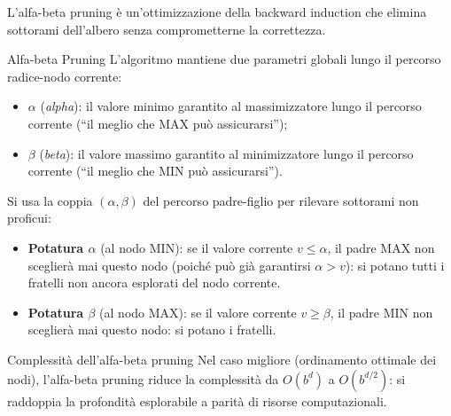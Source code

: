 \documentclass[12pt,a4paper,twoside]{book}
\theoremstyle{plain}
\theoremstyle{definition}
\begin{document}
L'alfa-beta pruning è un'ottimizzazione della backward induction che elimina sottorami dell'albero senza comprometterne la correttezza.

\begin{defbox}{Alfa-beta Pruning}
L'algoritmo mantiene due parametri globali lungo il percorso radice-nodo corrente:
\begin{itemize}
  \item $\alpha$ (\emph{alpha}): il valore minimo garantito al massimizzatore lungo il percorso corrente (``il meglio che MAX può assicurarsi'');
  \item $\beta$ (\emph{beta}): il valore massimo garantito al minimizzatore lungo il percorso corrente (``il meglio che MIN può assicurarsi'').
\end{itemize}
Si usa la coppia $(\alpha,\beta)$ del percorso padre-figlio per rilevare sottorami non proficui:
\begin{itemize}
  \item \textbf{Potatura $\alpha$} (al nodo MIN): se il valore corrente $v \le \alpha$, il padre MAX non sceglierà mai questo nodo (poiché può già garantirsi $\alpha>\mathit{v}$): si potano tutti i fratelli non ancora esplorati del nodo corrente.
  \item \textbf{Potatura $\beta$} (al nodo MAX): se il valore corrente $v \ge \beta$, il padre MIN non sceglierà mai questo nodo: si potano i fratelli.
\end{itemize}
\end{defbox}

\begin{thmbox}{Complessità dell'alfa-beta pruning}
Nel caso migliore (ordinamento ottimale dei nodi), l'alfa-beta pruning riduce la complessità da $O(b^d)$ a $O(b^{d/2})$: si raddoppia la profondità esplorabile a parità di risorse computazionali.
\end{thmbox}
\end{document}
